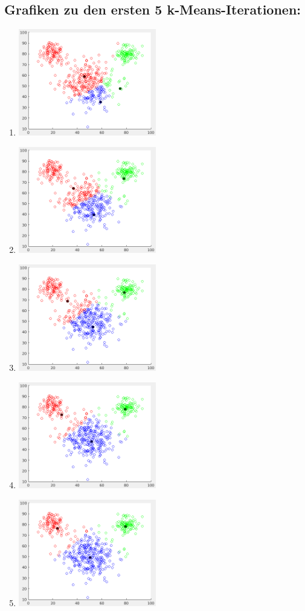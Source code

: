 \documentclass[12pt]{article}
\begin{document}
\subsection{Grafiken zu den ersten 5 k-Means-Iterationen:}

\begin{enumerate}
\item \includegraphics[width=6cm]{kmeans_iter1.png}
\item \includegraphics[width=6cm]{kmeans_iter2.png}
\item \includegraphics[width=6cm]{kmeans_iter3.png}
\item \includegraphics[width=6cm]{kmeans_iter4.png}
\item \includegraphics[width=6cm]{kmeans_iter5.png}
\end{enumerate}
\end{document}
